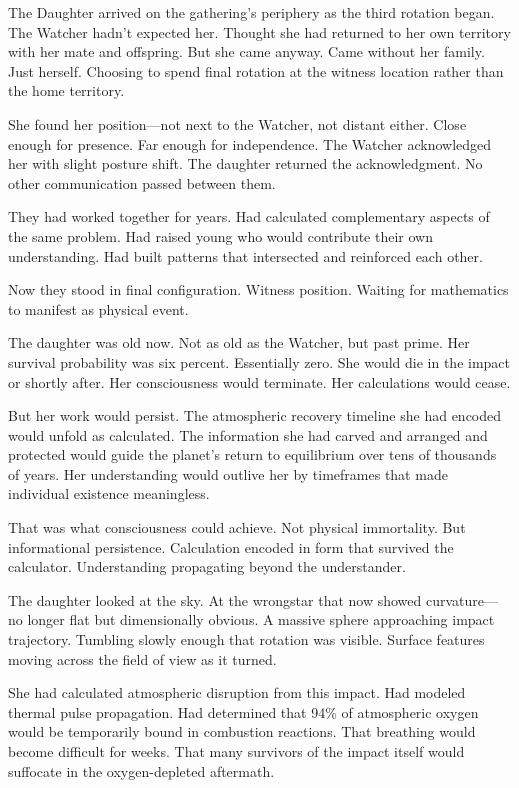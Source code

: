 \scenebreak

The Daughter arrived on the gathering's periphery as the third rotation began. The Watcher hadn't expected her. Thought she had returned to her own territory with her mate and offspring. But she came anyway. Came without her family. Just herself. Choosing to spend final rotation at the witness location rather than the home territory.

She found her position—not next to the Watcher, not distant either. Close enough for presence. Far enough for independence. The Watcher acknowledged her with slight posture shift. The daughter returned the acknowledgment. No other communication passed between them.

They had worked together for years. Had calculated complementary aspects of the same problem. Had raised young who would contribute their own understanding. Had built patterns that intersected and reinforced each other.

Now they stood in final configuration. Witness position. Waiting for mathematics to manifest as physical event.

The daughter was old now. Not as old as the Watcher, but past prime. Her survival probability was six percent. Essentially zero. She would die in the impact or shortly after. Her consciousness would terminate. Her calculations would cease.

But her work would persist. The atmospheric recovery timeline she had encoded would unfold as calculated. The information she had carved and arranged and protected would guide the planet's return to equilibrium over tens of thousands of years. Her understanding would outlive her by timeframes that made individual existence meaningless.

That was what consciousness could achieve. Not physical immortality. But informational persistence. Calculation encoded in form that survived the calculator. Understanding propagating beyond the understander.

The daughter looked at the sky. At the wrongstar that now showed curvature—no longer flat but dimensionally obvious. A massive sphere approaching impact trajectory. Tumbling slowly enough that rotation was visible. Surface features moving across the field of view as it turned.

She had calculated atmospheric disruption from this impact. Had modeled thermal pulse propagation. Had determined that 94\% of atmospheric oxygen would be temporarily bound in combustion reactions. That breathing would become difficult for weeks. That many survivors of the impact itself would suffocate in the oxygen-depleted aftermath.

